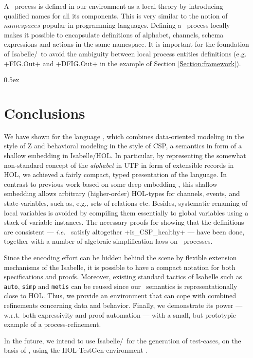 \documentclass[11pt,a4paper]{article}
\newcommand{\ie}{\textit{i.e.}\ }
\begin{document}
A \Circus\ process is defined in our environment as a local theory by introducing qualified names 
for all its components. This is very similar to the notion of $namespaces$ popular in programming 
languages. Defining a \Circus\ process locally makes it possible to encapsulate definitions of 
alphabet, channels, schema expressions and actions in the same namespace. It is important for the 
foundation of Isabelle/\Circus\ to avoid the ambiguity between local process entities definitions 
(e.g. \inlineisar+FIG.Out+ and \inlineisar+DFIG.Out+ in the example of 
Section \ref{Section:framework}). 


\newpage

\parindent 0pt\parskip 0.5ex



\section{Conclusions}
We have shown for the language \Circus , which combines data-oriented modeling in the style of Z and 
behavioral modeling in the style of CSP, a semantics in form of a shallow embedding in Isabelle/HOL. 
In particular, by representing the somewhat non-standard concept of the \emph{alphabet} in UTP  in 
form of extensible records in HOL, we achieved a fairly compact, typed presentation of the language. 
In contrast to previous work based on some deep embedding \cite{ZC09}, this shallow embedding allows 
arbitrary (higher-order) HOL-types for channels, events, and state-variables, such as, e.g., sets of 
relations etc.  Besides, systematic renaming of local variables is avoided by compiling them 
essentially to global variables using a stack of variable instances. The necessary proofs for
showing that the definitions are consistent --- \ie{} satisfy altogether \inlineisar+is_CSP_healthy+ 
--- have been done, together with a number of algebraic simplification laws on \Circus\ processes.
 
Since the encoding effort can be hidden behind the scene by flexible extension mechanisms of the 
Isabelle, it is possible to have a compact notation for both specifications and proofs. Moreover, 
existing standard tactics of Isabelle such as \verb+auto+, \verb+simp+ and \verb+metis+ can be 
reused since our \Circus\ semantics is representationally close to HOL. Thus, we provide an 
environment that can cope with combined refinements concerning data and behavior. Finally, we 
demonstrate its power --- w.r.t. both expressivity and %
proof automation --- with a small, but prototypic example of a process-refinement. 

In the future, we intend to use Isabelle/\Circus\ for the generation of test-cases, on the basis of 
\cite{CavalGau:Acta:2011}, using 
the HOL-TestGen-environment \cite{brucker.ea:theorem-prover:2012}.





\end{document}
